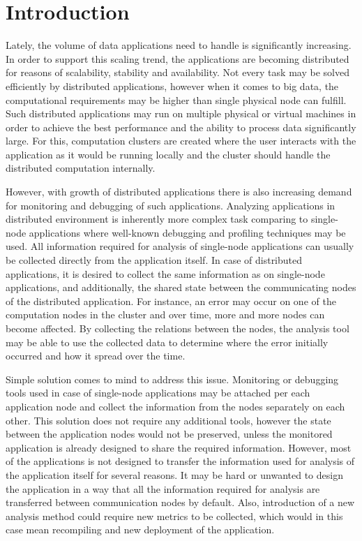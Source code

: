 \chapter{Introduction}
Lately, the volume of data applications need to handle is significantly increasing. In order to support this scaling trend, the applications are becoming distributed for reasons of scalability, stability and availability. Not every task may be solved efficiently by distributed applications, however when it comes to big data, the computational requirements may be higher than single physical node can fulfill. Such distributed applications may run on multiple physical or virtual machines in order to achieve the best performance and the ability to process data significantly large. For this, computation clusters are created where the user interacts with the application as it would be running locally and the cluster should handle the distributed computation internally.

However, with growth of distributed applications there is also increasing demand for monitoring and debugging of such applications. Analyzing applications in distributed environment is inherently more complex task comparing to single-node applications where well-known debugging and profiling techniques may be used. All information required for analysis of single-node applications can usually be collected directly from the application itself. In case of distributed applications, it is desired to collect the same information as on single-node applications, and additionally, the shared state between the communicating nodes of the distributed application. For instance, an error may occur on one of the computation nodes in the cluster and over time, more and more nodes can become affected. By collecting the relations between the nodes, the analysis tool may be able to use the collected data to determine where the error initially occurred and how it spread over the time. 

Simple solution comes to mind to address this issue. Monitoring or debugging tools used in case of single-node applications may be attached per each application node and collect the information from the nodes separately on each other. This solution does not require any additional tools, however the state between the application nodes would not be preserved, unless the monitored application is already designed to share the required information. However, most of the applications is not designed to transfer the information used for analysis of the application itself for several reasons. It may be hard or unwanted to design the application in a way that all the information required for analysis are transferred between communication nodes by default. Also, introduction of a new analysis method could require new metrics to be collected, which would in this case mean recompiling and new deployment of the application.

